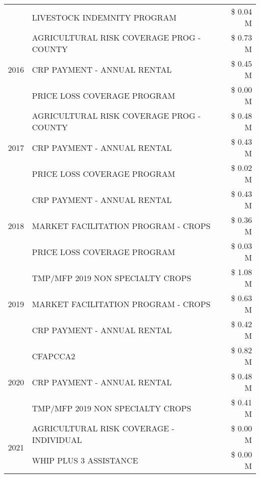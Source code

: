 \begin{tabular}{llr}
 & LIVESTOCK INDEMNITY PROGRAM & \$ 0.04 M \\
\cline{1-3}
\multirow[t]{3}{*}{2016} & AGRICULTURAL RISK COVERAGE PROG - COUNTY & \$ 0.73 M \\
 & CRP PAYMENT - ANNUAL RENTAL & \$ 0.45 M \\
 & PRICE LOSS COVERAGE PROGRAM & \$ 0.00 M \\
\cline{1-3}
\multirow[t]{3}{*}{2017} & AGRICULTURAL RISK COVERAGE PROG - COUNTY & \$ 0.48 M \\
 & CRP PAYMENT - ANNUAL RENTAL & \$ 0.43 M \\
 & PRICE LOSS COVERAGE PROGRAM & \$ 0.02 M \\
\cline{1-3}
\multirow[t]{3}{*}{2018} & CRP PAYMENT - ANNUAL RENTAL & \$ 0.43 M \\
 & MARKET FACILITATION PROGRAM - CROPS & \$ 0.36 M \\
 & PRICE LOSS COVERAGE PROGRAM & \$ 0.03 M \\
\cline{1-3}
\multirow[t]{3}{*}{2019} & TMP/MFP 2019 NON SPECIALTY CROPS & \$ 1.08 M \\
 & MARKET FACILITATION PROGRAM - CROPS & \$ 0.63 M \\
 & CRP PAYMENT - ANNUAL RENTAL & \$ 0.42 M \\
\cline{1-3}
\multirow[t]{3}{*}{2020} & CFAPCCA2 & \$ 0.82 M \\
 & CRP PAYMENT - ANNUAL RENTAL & \$ 0.48 M \\
 & TMP/MFP 2019 NON SPECIALTY CROPS & \$ 0.41 M \\
\cline{1-3}
\multirow[t]{2}{*}{2021} & AGRICULTURAL RISK COVERAGE - INDIVIDUAL & \$ 0.00 M \\
 & WHIP PLUS 3 ASSISTANCE & \$ 0.00 M \\
\cline{1-3}
\bottomrule
\end{tabular}
